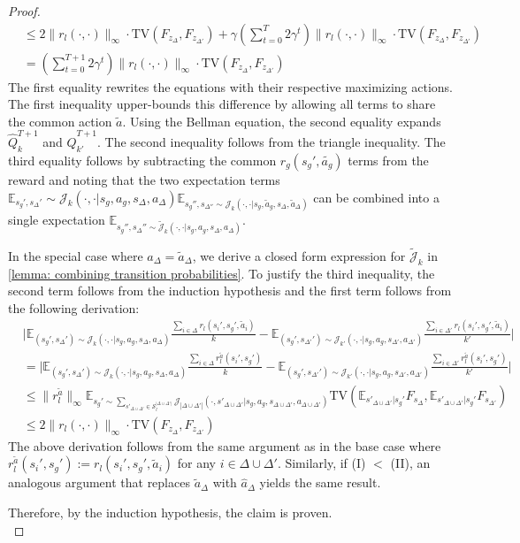 \documentclass{article}
\theoremstyle{plain}
\theoremstyle{definition}
\def\E{\mathbb{E}}
\begin{document}
\begin{proof}
\begin{align*}
&\leq 2\|r_l(\cdot,\cdot)\|_\infty \cdot \mathrm{TV}(F_{z_\Delta}, F_{z_{\Delta'}}) +  \gamma\left(\sum_{t=0}^{T}2\gamma^t\right)\|r_l(\cdot,\cdot)\|_\infty\cdot\mathrm{TV}(F_{z_\Delta}, F_{z_{\Delta'}}) \\
&= \left(\sum_{t=0}^{T+1}2\gamma^t\right)\|r_l(\cdot,\cdot)\|_\infty\cdot \mathrm{TV}(F_{z_\Delta}, F_{z_{\Delta'}})
\end{align*}
The first equality rewrites the equations with their respective maximizing actions. The first inequality upper-bounds this difference by allowing all terms to share the common action $\tilde{a}$. Using the Bellman equation, the second equality expands $\hat{Q}_k^{T+1}$ and $\hat{Q}_{k'}^{T+1}$. The second inequality follows from the triangle inequality. The third equality follows by subtracting the common $r_g(s_g',\tilde{a_g})$ terms from the reward and noting that the two expectation terms $\E_{s_g',s_\Delta'}\sim\mathcal{J}_k(\cdot,\cdot|s_g,a_g,s_\Delta,a_\Delta)\E_{s_g'',s_{\Delta''}\sim\mathcal{J}_k(\cdot,\cdot|s_g,\tilde{a}_g, s_\Delta, \tilde{a}_\Delta)}$ can be combined into a single expectation $\E_{s_g'',s_\Delta''\sim\tilde{\mathcal{J}}_k(\cdot,\cdot|s_g,a_g,s_\Delta,a_\Delta)}$.

In the special case where $a_\Delta = \tilde{a}_\Delta$, we derive a closed form expression for $\tilde{\mathcal{J}}_k$ in \cref{lemma: combining transition probabilities}. To justify the third inequality, the second term follows from the induction hypothesis and the first term follows from the following derivation:
\begin{align*}
&\bigg|\E_{(s_g',s_\Delta')\sim\mathcal{J}_k(\cdot,\cdot|s_g,a_g,s_\Delta,a_\Delta)} \frac{\sum_{i\in\Delta}r_l(s_i',s_g',\tilde{a}_i)}{k} - \E_{(s_g',s_{\Delta'}')\sim\mathcal{J}_{k'}(\cdot,\cdot|s_g,a_g,s_{\Delta'},a_{\Delta'})}\frac{\sum_{i\in\Delta'}r_l(s_i',s_g',\tilde{a}_i)}{k'}\bigg| \\
&= \bigg|\E_{(s_g',s_\Delta')\sim\mathcal{J}_k(\cdot,\cdot|s_g,a_g,s_\Delta,a_\Delta)} \frac{\sum_{i\in\Delta}r^{\tilde{a}}_l(s_i',s_g')}{k} - \E_{(s_g',s_{\Delta'}')\sim\mathcal{J}_{k'}(\cdot,\cdot|s_g,a_g,s_{\Delta'},a_{\Delta'})}\frac{\sum_{i\in\Delta'}r_l^{\tilde{a}}(s_i',s_g')}{k'}\bigg| \\
&\leq \|r_l^{\tilde{a}}\|_\infty \E_{s_g'\sim \sum_{s'_{\Delta\cup\Delta'}\in\mathcal{S}_l^{|\Delta\cup\Delta'|}}\mathcal{J}_{|\Delta\cup\Delta'|}(\cdot,s'_{\Delta\cup\Delta'}|s_g,a_g,s_{\Delta\cup\Delta'},a_{\Delta\cup\Delta'})}\mathrm{TV}(\E_{s'_{\Delta\cup\Delta'}|s_g'} F_{s_{\Delta}}, \E_{s'_{\Delta\cup\Delta'}|s_g'} F_{s_{\Delta'}}) \\
&\leq 2\|r_l(\cdot,\cdot)\|_\infty\cdot \mathrm{TV}(F_{z_\Delta}, F_{z_{\Delta'}})
\end{align*}
The above derivation follows from the same argument as in the base case where $r_l^{\tilde{a}}(s_i',s_g'):=r_l(s_i',s_g',\tilde{a}_i)$ for any $i\in\Delta\cup\Delta'$. Similarly, if (I) $ < $ (II), an analogous argument that replaces $\tilde{a}_\Delta$ with $\hat{a}_\Delta$ yields the same result.

Therefore, by the induction hypothesis, the claim is proven.\qedhere \\
\end{proof}
\end{document}
